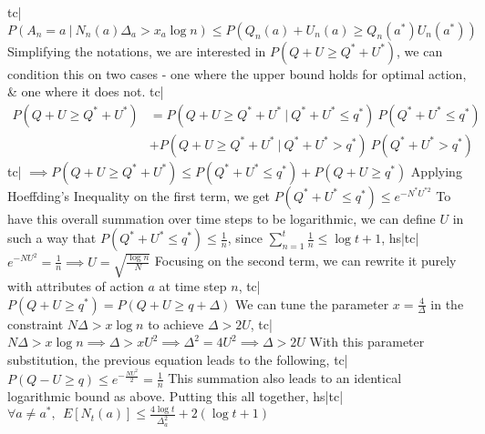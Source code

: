 tc| \( P(A_n = a \ | \ N_n(a) \Delta_a > x_a \log n) \le P(Q_n(a) + U_n(a) \ge Q_n(a^*)  U_n(a^*)) \)
Simplifying the notations, we are interested in \( P(Q + U \ge Q^* + U^*) \), we can condition this on two cases - one where the upper bound holds for optimal action, & one where it does not.
tc| \( \begin{align} P(Q + U \ge Q^* + U^*) &= P(Q + U \ge Q^* + U^* \ | \ Q^* + U^* \le q^*) \ P(Q^* + U^* \le q^*) \\ &+ P(Q + U \ge Q^* + U^* \ | \ Q^* + U^* > q^*) \ P(Q^* + U^* > q^*) \end{align} \)
tc| \( \implies P(Q + U \ge Q^* + U^*) \le P(Q^* + U^* \le q^*) + P(Q + U \ge q^*)  \)
Applying Hoeffding's Inequality on the first term, we get \( P(Q^* + U^* \le q^*) \le e^{-N^* U^{*2} } \)
To have this overall summation over time steps to be logarithmic, we can define \(U\) in such a way that \( P(Q^* + U^* \le q^*) \le \frac{1}{n} \), since \( \sum_{n=1}^t \frac{1}{n} \le \log t + 1 \),
hs|tc| \( e^{- NU^2 } = \frac{1}{n} \implies U = \sqrt{ \frac{ \log n }{ N } } \)
Focusing on the second term, we can rewrite it purely with attributes of action \(a\) at time step \(n\),
tc| \( P(Q + U \ge q^*) = P(Q + U \ge q + \Delta) \)
We can tune the parameter \(x = \frac{4}{\Delta}\) in the constraint \( N \Delta > x \log n \) to achieve \( \Delta > 2 U \),
tc| \( N \Delta > x \log n \implies \Delta > x U^2 \implies \Delta^2 = 4U^2 \implies \Delta > 2U \)
With this parameter substitution, the previous equation leads to the following,
tc| \( P(Q - U \ge q) \le e^{-\frac{NU^2}{2}} = \frac{1}{n} \)
This summation also leads to an identical logarithmic bound as above. Putting this all together,
hs|tc| \( \forall a \neq a^*, \ \ E[N_t(a)] \le \frac{4 \log t}{\Delta_a^2} + 2(\log t + 1) \)